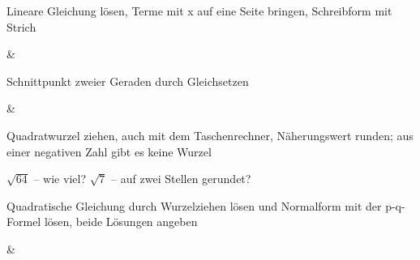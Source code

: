 \begin{aufgabe}{Lineare Gleichung lösen, Terme mit x auf eine Seite bringen, Schreibform mit Strich}
\begin{gleichungsraster}[2]
 &
 \\
\end{gleichungsraster}
\end{aufgabe}

\begin{aufgabe}{Schnittpunkt zweier Geraden durch Gleichsetzen}
\begin{gleichungsraster}[2]
 &
 \\
\end{gleichungsraster}
\end{aufgabe}

\begin{aufgabe}{Quadratwurzel ziehen, auch mit dem Taschenrechner, Näherungswert runden; aus einer negativen Zahl gibt es keine Wurzel}
\begin{teile}
\teil $\sqrt{64}$ – wie viel? \leerfeld
\teil $\sqrt{7}$ – auf zwei Stellen gerundet? \leerfeld
\end{teile}
\end{aufgabe}

\begin{aufgabe}{Quadratische Gleichung durch Wurzelziehen lösen und Normalform mit der p-q-Formel lösen, beide Lösungen angeben}
\begin{gleichungsraster}[2]
 &
 \\
\end{gleichungsraster}
\end{aufgabe}

